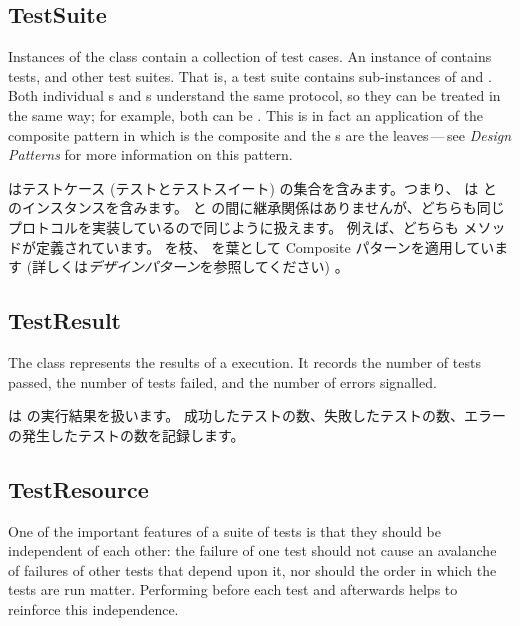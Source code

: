 \documentclass[a4paper,10pt,twoside]{book}
\begin{document}
{%
\subsection{TestSuite}

Instances of the class  contain a collection of test cases.  An
instance of  contains tests, and other test suites.
That is, a test suite contains sub-instances of
 and .
Both individual s and s understand the same protocol, so they can be treated in the same way; for example, both can be .
This is in fact an application of the composite
pattern in which  is the composite and the
s are the leaves\,---\,see \textit{Design Patterns} for more information on this pattern\cite{Gamm95a}.
\fi

 はテストケース (テストとテストスイート) の集合を含みます。つまり、  は  と  のインスタンスを含みます。
 と  の間に継承関係はありませんが、どちらも同じプロトコルを実装しているので同じように扱えます。
例えば、どちらも  メソッドが定義されています。
 を枝、  を葉として Composite パターンを適用しています (詳しくは\textit{デザインパターン}を参照してください) 。

\subsection{TestResult}

The class  represents the results of a
 execution.  It records the number of tests passed,
the number of tests failed, and the number of errors signalled.
\fi

 は  の実行結果を扱います。
成功したテストの数、失敗したテストの数、エラーの発生したテストの数を記録します。

\subsection{TestResource}

One of the important  features of a suite of tests is that they should be independent of each other: the failure of one test should not cause an avalanche of failures of other tests that depend upon it, nor should the order in which the tests are run matter.
Performing  before each test and  afterwards helps to reinforce this independence. 

}
\end{document}
